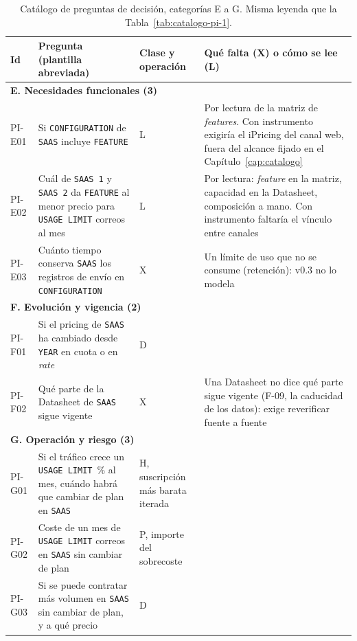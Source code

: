 \begin{table}[htbp]
\centering
\scriptsize
\begin{tabular}{|l|>{\raggedright\arraybackslash}p{6.6cm}|>{\raggedright\arraybackslash}p{2.2cm}|>{\raggedright\arraybackslash}p{3.4cm}|}
\hline
\textbf{Id} & \textbf{Pregunta (plantilla abreviada)} & \textbf{Clase y operación} & \textbf{Qué falta (X) o cómo se lee (L)} \\
\hline
\multicolumn{4}{|l|}{\textbf{E. Necesidades funcionales (3)}} \\
\hline
PI-E01 & Si \texttt{CONFIGURATION} de \texttt{SAAS} incluye \texttt{FEATURE} & L & Por lectura de la matriz de \textit{features}. Con instrumento exigiría el iPricing del canal web, fuera del alcance fijado en el Capítulo~\ref{cap:catalogo} \\
PI-E02 & Cuál de \texttt{SAAS 1} y \texttt{SAAS 2} da \texttt{FEATURE} al menor precio para \texttt{USAGE LIMIT} correos al mes & L & Por lectura: \textit{feature} en la matriz, capacidad en la Datasheet, composición a mano. Con instrumento faltaría el vínculo entre canales \\
PI-E03 & Cuánto tiempo conserva \texttt{SAAS} los registros de envío en \texttt{CONFIGURATION} & X & Un límite de uso que no se consume (retención): v0.3 no lo modela \\
\hline
\multicolumn{4}{|l|}{\textbf{F. Evolución y vigencia (2)}} \\
\hline
PI-F01 & Si el pricing de \texttt{SAAS} ha cambiado desde \texttt{YEAR} en cuota o en \textit{rate} & D & \\
PI-F02 & Qué parte de la Datasheet de \texttt{SAAS} sigue vigente & X & Una Datasheet no dice qué parte sigue vigente (\mbox{F-09}, la caducidad de los datos): exige reverificar fuente a fuente \\
\hline
\multicolumn{4}{|l|}{\textbf{G. Operación y riesgo (3)}} \\
\hline
PI-G01 & Si el tráfico crece un \texttt{USAGE LIMIT}~\% al mes, cuándo habrá que cambiar de plan en \texttt{SAAS} & H, suscripción más barata iterada & \\
PI-G02 & Coste de un mes de \texttt{USAGE LIMIT} correos en \texttt{SAAS} sin cambiar de plan & P, importe del sobrecoste & \\
PI-G03 & Si se puede contratar más volumen en \texttt{SAAS} sin cambiar de plan, y a qué precio & D & \\
\hline
\end{tabular}
\caption[Catálogo de preguntas de decisión, categorías E a G]{Catálogo de preguntas de decisión, categorías E a G. Misma
leyenda que la Tabla~\ref{tab:catalogo-pi-1}.}
\label{tab:catalogo-pi-3}
\end{table}


